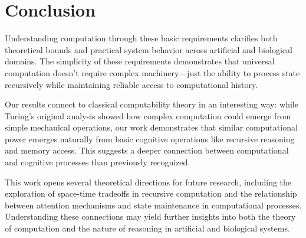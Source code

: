\documentclass[12pt]{article}
\begin{document}
\section{Conclusion}

Understanding computation through these basic requirements clarifies both theoretical bounds and practical system behavior across artificial and biological domains. The simplicity of these requirements demonstrates that universal computation doesn't require complex machinery---just the ability to process state recursively while maintaining reliable access to computational history.

Our results connect to classical computability theory in an interesting way: while Turing's original analysis showed how complex computation could emerge from simple mechanical operations, our work demonstrates that similar computational power emerges naturally from basic cognitive operations like recursive reasoning and memory access. This suggests a deeper connection between computational and cognitive processes than previously recognized.

This work opens several theoretical directions for future research, including the exploration of space-time tradeoffs in recursive computation and the relationship between attention mechanisms and state maintenance in computational processes. Understanding these connections may yield further insights into both the theory of computation and the nature of reasoning in artificial and biological systems.
\end{document}
